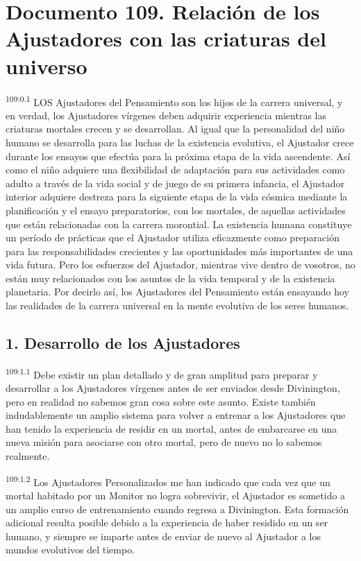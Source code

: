 \chapter{Documento 109. Relación de los Ajustadores con las criaturas del universo}
\par
\textsuperscript{109:0.1} LOS Ajustadores del Pensamiento son los hijos de la carrera universal, y en verdad, los Ajustadores vírgenes deben adquirir experiencia mientras las criaturas mortales crecen y se desarrollan. Al igual que la personalidad del niño humano se desarrolla para las luchas de la existencia evolutiva, el Ajustador crece durante los ensayos que efectúa para la próxima etapa de la vida ascendente. Así como el niño adquiere una flexibilidad de adaptación para sus actividades como adulto a través de la vida social y de juego de su primera infancia, el Ajustador interior adquiere destreza para la siguiente etapa de la vida cósmica mediante la planificación y el ensayo preparatorios, con los mortales, de aquellas actividades que están relacionadas con la carrera morontial. La existencia humana constituye un período de prácticas que el Ajustador utiliza eficazmente como preparación para las responsabilidades crecientes y las oportunidades más importantes de una vida futura. Pero los esfuerzos del Ajustador, mientras vive dentro de vosotros, no están muy relacionados con los asuntos de la vida temporal y de la existencia planetaria. Por decirlo así, los Ajustadores del Pensamiento están ensayando hoy las realidades de la carrera universal en la mente evolutiva de los seres humanos.

\section*{1. Desarrollo de los Ajustadores}
\par
\textsuperscript{109:1.1} Debe existir un plan detallado y de gran amplitud para preparar y desarrollar a los Ajustadores vírgenes antes de ser enviados desde Divinington, pero en realidad no sabemos gran cosa sobre este asunto. Existe también indudablemente un amplio sistema para volver a entrenar a los Ajustadores que han tenido la experiencia de residir en un mortal, antes de embarcarse en una nueva misión para asociarse con otro mortal, pero de nuevo no lo sabemos realmente.

\par
\textsuperscript{109:1.2} Los Ajustadores Personalizados me han indicado que cada vez que un mortal habitado por un Monitor no logra sobrevivir, el Ajustador es sometido a un amplio curso de entrenamiento cuando regresa a Divinington. Esta formación adicional resulta posible debido a la experiencia de haber residido en un ser humano, y siempre se imparte antes de enviar de nuevo al Ajustador a los mundos evolutivos del tiempo.

